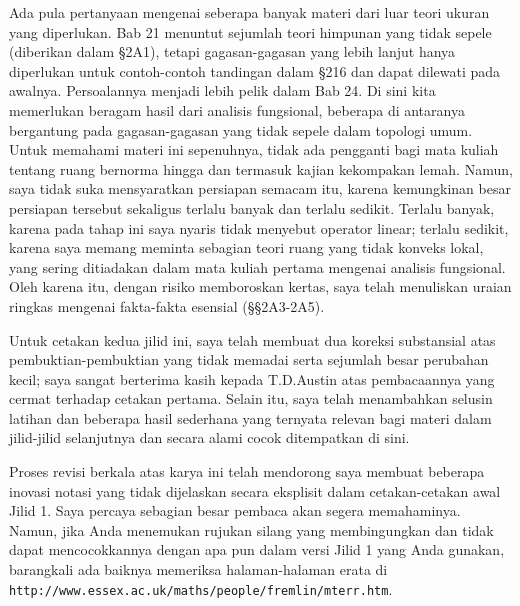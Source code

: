 Ada pula pertanyaan mengenai seberapa banyak materi dari luar teori ukuran
yang diperlukan. Bab 21 menuntut sejumlah teori himpunan yang tidak sepele
(diberikan dalam \S2A1), tetapi gagasan-gagasan yang lebih lanjut hanya
diperlukan untuk contoh-contoh tandingan dalam \S216 dan dapat dilewati
pada awalnya. Persoalannya menjadi lebih pelik dalam Bab 24. Di sini kita
memerlukan beragam hasil dari analisis fungsional, beberapa di antaranya
bergantung pada gagasan-gagasan yang tidak sepele dalam topologi umum.
Untuk memahami materi ini sepenuhnya, tidak ada pengganti bagi mata kuliah
tentang ruang bernorma hingga dan termasuk kajian kekompakan lemah. Namun,
saya
tidak suka mensyaratkan persiapan semacam itu, karena kemungkinan besar
persiapan tersebut sekaligus terlalu banyak dan terlalu sedikit. Terlalu
banyak, karena pada tahap ini saya nyaris tidak menyebut operator linear;
terlalu sedikit, karena saya memang meminta sebagian teori ruang yang tidak
konveks lokal, yang sering ditiadakan dalam mata kuliah pertama mengenai
analisis fungsional. Oleh karena itu, dengan risiko memboroskan kertas, saya
telah menuliskan uraian ringkas mengenai fakta-fakta esensial
(\S\S2A3-2A5).  %
 
\bigskip
     
     
\medskip
     
Untuk cetakan kedua jilid ini, saya telah membuat dua koreksi substansial
atas pembuktian-pembuktian yang tidak memadai serta sejumlah besar
perubahan kecil; saya sangat berterima kasih kepada T.D.Austin atas
pembacaannya yang cermat terhadap cetakan pertama. Selain itu, saya telah
menambahkan selusin latihan dan beberapa hasil sederhana yang ternyata
relevan bagi materi dalam jilid-jilid selanjutnya dan secara alami cocok
ditempatkan di sini.
     
Proses revisi berkala atas karya ini telah mendorong saya membuat beberapa
inovasi notasi yang tidak dijelaskan secara eksplisit dalam cetakan-cetakan
awal Jilid 1. Saya percaya sebagian besar pembaca akan segera memahaminya.
Namun, jika Anda menemukan rujukan silang yang membingungkan dan tidak
dapat mencocokkannya dengan apa pun dalam versi Jilid 1 yang Anda gunakan,
barangkali ada baiknya memeriksa halaman-halaman erata di {\tt
http://www.essex.ac.uk/maths/people/fremlin/mterr.htm}.
     
\bigskip


